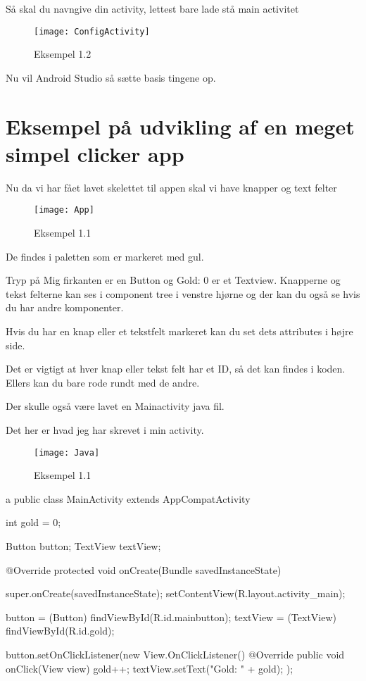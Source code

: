 Så skal du navngive din activity, lettest bare lade stå main activitet 

\begin{figure}[h]
	\texttt{[image: ConfigActivity]}
	\caption{Eksempel 1.2}
	\label{fig:Config Activiy}
\end{figure}

Nu vil Android Studio så sætte basis tingene op.

\FloatBarrier

\section{Eksempel på udvikling af en meget simpel clicker app}

Nu da vi har fået lavet skelettet til appen skal vi have knapper og text felter

\begin{figure}[h]
	\texttt{[image: App]}
	\caption{Eksempel 1.1}
	\label{fig:App}
\end{figure}

De findes i paletten som er markeret med gul. 

Tryp på Mig firkanten er en Button og Gold: 0 er et Textview. 
Knapperne og tekst felterne kan ses i component tree i venstre hjørne og der kan du også se hvis du har andre komponenter.

Hvis du har en knap eller et tekstfelt markeret kan du set dets attributes i højre side.

Det er vigtigt at hver knap eller tekst felt har et ID, så det kan findes i koden. Ellers kan du bare rode rundt med de andre. 

Der skulle også være lavet en Mainactivity java fil.

Det her er hvad jeg har skrevet i min activity. 
\begin{figure}[h]
	\texttt{[image: Java]}
	\caption{Eksempel 1.1}
	\label{fig:Java}
\end{figure}

\begin{JavaCode}{2}{a}
	public class MainActivity extends AppCompatActivity {
		int gold = 0;
		
		Button button;
		TextView textView;
		
		@Override
		protected void onCreate(Bundle savedInstanceState) {
			super.onCreate(savedInstanceState);
			setContentView(R.layout.activity_main);
			
			button = (Button) findViewById(R.id.mainbutton);
			textView = (TextView) findViewById(R.id.gold);
			
			button.setOnClickListener(new View.OnClickListener() {
				@Override
				public void onClick(View view) {
					gold++;
					textView.setText("Gold: " + gold);	
				}
			});
		}
	}
\end{JavaCode}

